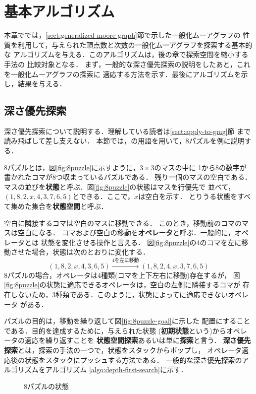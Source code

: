 
\chapter{基本アルゴリズム}
\label{chap:basic-algorithm}
本章ででは，\ref{sect:generalized-moore-graph}節で示した一般化ムーアグラフの
性質を利用して，与えられた頂点数と次数の一般化ムーアグラフを探索する基本的な
アルゴリズムを与える．このアルゴリズムは，後の章で探索空間を縮小する手法の
比較対象となる．
まず，一般的な深さ優先探索の説明をしたあと，これを一般化ムーアグラフの探索に
適応する方法を示す．最後にアルゴリズムを示し，結果を与える．

\section{深さ優先探索}
\label{sect:depth-first-search}
深さ優先探索について説明する．理解している読者は\ref{sect:apply-to-gmg}節
まで読み飛ばして差し支えない．
本節では，\cite{Makoto1988}の用語を用いて，8パズルを例に説明する．

8パズルとは，図\ref{fig:8puzzle}に示すように，$3\times3$のマスの中に
1から8の数字が書かれたコマが8つ収まっているパズルである．
残り一個のマスの空白である．
マスの並びを\textbf{状態}と呼ぶ．図\ref{fig:8puzzle}の状態はマスを行優先で
並べて，$(1,8,2,x,4,3,7,6,5)$とできる．ここで，$x$は空白を示す．
とりうる状態をすべて集めた集合を\textbf{状態空間}と呼ぶ．

空白に隣接するコマは空白のマスに移動できる．
このとき，移動前のコマのマスは空白になる．
コマおよび空白の移動を\textbf{オペレータ}と呼ぶ．一般的に，オペレータとは
状態を変化させる操作と言える．
図\ref{fig:8puzzle}の4のコマを左に移動させた場合，状態は次のとおりに変化する．
\[ (1,8,2,x,4,3,6,5) \xrightarrow{\text{4を左に移動}} (1,8,2,4,x,3,7,6,5) \]
8パズルの場合，オペレータは4種類(コマを上下左右に移動)存在するが，
図\ref{fig:8puzzle}の状態に適応できるオペレータは，空白の左側に隣接するコマが
存在しないため，3種類である．このように，状態によってに適応できないオペレータ
がある．

パズルの目的は，移動を繰り返して図\ref{fig:8puzzle-goal}に示した
配置にすることである．目的を達成するために，与えられた状態
(\textbf{初期状態}という)からオペレータの適応を繰り返すことを
\textbf{状態空間探索}あるいは単に\textbf{探索}と言う．
\textbf{深さ優先探索}とは，探索の手法の一つで，状態をスタックからポップし，
オペレータ適応後の状態をスタックにプッシュする方法である．
一般的な深さ優先探索のアルゴリズムをアルゴリズム
\ref{algo:depth-first-search}に示す．

\begin{figure}
  \centering
  \hspace{3em}
  \caption{8パズルの状態}
\end{figure}

